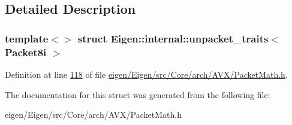 \subsection{Detailed Description}
\subsubsection*{template$<$$>$\newline
struct Eigen\+::internal\+::unpacket\+\_\+traits$<$ Packet8i $>$}



Definition at line \hyperlink{eigen_2_eigen_2src_2_core_2arch_2_a_v_x_2_packet_math_8h_source_l00118}{118} of file \hyperlink{eigen_2_eigen_2src_2_core_2arch_2_a_v_x_2_packet_math_8h_source}{eigen/\+Eigen/src/\+Core/arch/\+A\+V\+X/\+Packet\+Math.\+h}.



The documentation for this struct was generated from the following file\+:\begin{DoxyCompactItemize}
\item 
eigen/\+Eigen/src/\+Core/arch/\+A\+V\+X/\+Packet\+Math.\+h\end{DoxyCompactItemize}

